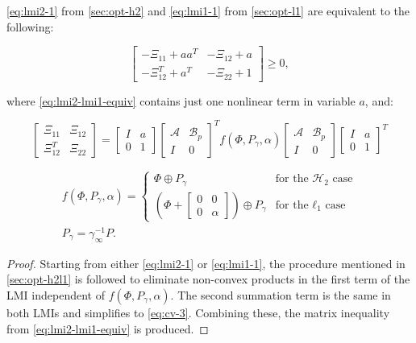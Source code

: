 \begin{thm}
	\autoref{eq:lmi2-1} from \autoref{sec:opt-h2} and \autoref{eq:lmi1-1} from \autoref{sec:opt-l1} are equivalent to the following:
	
	\begin{equation} \label{eq:lmi2-lmi1-equiv}
		\begin{bmatrix}
			-\Xi_{11} + aa^T & -\Xi_{12} + a \\
			-\Xi_{12}^T + a^T & -\Xi_{22} + 1
		\end{bmatrix} \geq 0,
	\end{equation}
	
	where \autoref{eq:lmi2-lmi1-equiv} contains just one nonlinear term in variable $a$, and:

	\begin{equation*}
		\begin{bmatrix}
			\Xi_{11} & \Xi_{12} \\
			\Xi_{12}^T & \Xi_{22}
		\end{bmatrix} =
		\begin{bmatrix}
			I & a \\
			0 & 1
		\end{bmatrix}
		\begin{bmatrix}
			\mathcal{A} & \mathcal{B}_p \\
			I & 0
		\end{bmatrix}^T
		f\left(\Phi, P_\gamma, \alpha\right)
		\begin{bmatrix}
			\mathcal{A} & \mathcal{B}_p \\
			I & 0
		\end{bmatrix} 
		\begin{bmatrix}
			I & a \\
			0 & 1
		\end{bmatrix}^T
	\end{equation*}

	\begin{gather} \label{eq:pq}
		f\left(\Phi, P_\gamma, \alpha\right) = 
		\begin{cases}
			\Phi \oplus P_\gamma & \textrm{for the $\mathcal{H}_2$ case} \\
			\left(\Phi + \begin{bmatrix} 0 & 0 \\ 0 & \alpha \end{bmatrix}\right) \oplus P_\gamma & \textrm{for the $\ell_1$ case}
		\end{cases} \\
		P_\gamma = \gamma_\infty^{-1}P.
	\end{gather}
\end{thm}

\begin{proof}
	Starting from either \autoref{eq:lmi2-1} or \autoref{eq:lmi1-1}, the procedure mentioned in \autoref{sec:opt-h2l1} is followed to eliminate non-convex products in the first term of the \gls{LMI} independent of $f\left(\Phi, P_\gamma, \alpha\right)$. The second summation term is the same in both \gls{LMI}s and simplifies to \autoref{eq:cv-3}. Combining these, the matrix inequality from \autoref{eq:lmi2-lmi1-equiv} is produced.
\end{proof}